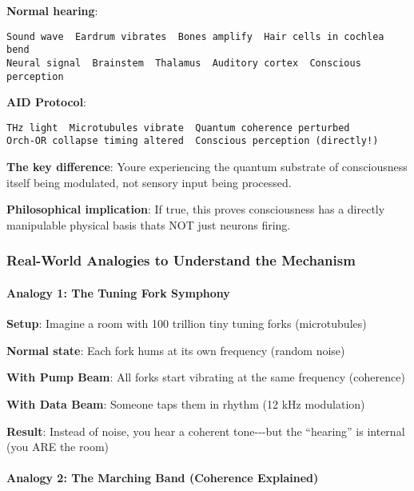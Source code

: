 \textbf{Normal hearing}:

\begin{verbatim}
Sound wave  Eardrum vibrates  Bones amplify  Hair cells in cochlea bend  
Neural signal  Brainstem  Thalamus  Auditory cortex  Conscious perception
\end{verbatim}

\textbf{AID Protocol}:

\begin{verbatim}
THz light  Microtubules vibrate  Quantum coherence perturbed  
Orch-OR collapse timing altered  Conscious perception (directly!)
\end{verbatim}

\textbf{The key difference}: You\textquotesingle re experiencing the
quantum substrate of consciousness itself being modulated, not sensory
input being processed.

\textbf{Philosophical implication}: If true, this proves consciousness
has a directly manipulable physical basis that\textquotesingle s NOT
just neurons firing.

\subsubsection{Real-World Analogies to Understand the
Mechanism}\label{real-world-analogies-to-understand-the-mechanism}

\paragraph{Analogy 1: The Tuning Fork
Symphony}\label{analogy-1-the-tuning-fork-symphony}

\textbf{Setup}: Imagine a room with 100 trillion tiny tuning forks
(microtubules)

\textbf{Normal state}: Each fork hums at its own frequency (random
noise)

\textbf{With Pump Beam}: All forks start vibrating at the same frequency
(coherence)

\textbf{With Data Beam}: Someone taps them in rhythm (12 kHz modulation)

\textbf{Result}: Instead of noise, you hear a coherent tone-\/-\/-but
the ``hearing'' is internal (you ARE the room)

\paragraph{Analogy 2: The Marching Band (Coherence
Explained)}\label{analogy-2-the-marching-band-coherence-explained}

